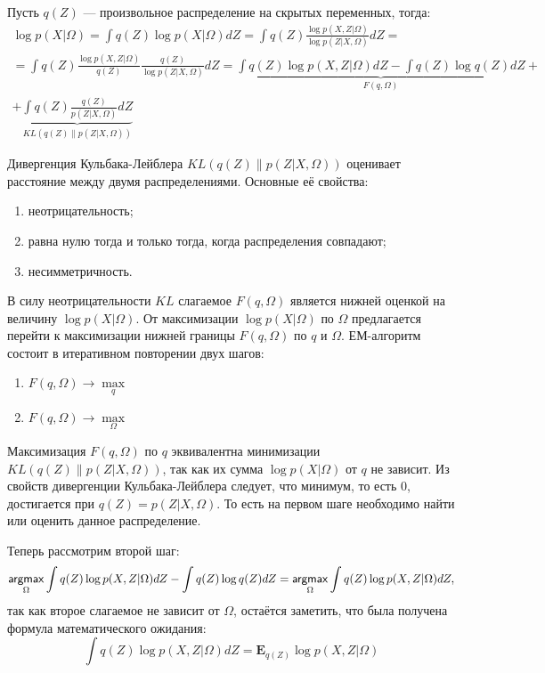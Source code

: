 \documentclass[12pt]{article}
\newcommand{\argmax}{\mathop{\mathsf{argmax}}\limits}
\begin{document}
 Пусть $q(Z)$ --- произвольное распределение на скрытых переменных, тогда:
\begin{multline}
\label{eq:emdecomposition}
\log p(X|\Omega) = \int q(Z) \log p(X|\Omega) dZ = \int q(Z) \frac{\log p(X, Z|\Omega)}{\log p(Z|X,\Omega)} dZ = 
\\
=  \int q(Z) \frac{\log p(X, Z|\Omega)}{q(Z)} \frac{q(Z)}{\log p(Z|X,\Omega)} dZ =  \underbrace{  \int q(Z) \log p(X, Z|\Omega) dZ  - \int q(Z) \log q(Z) dZ }_{F(q, \Omega)} +
\\
+  \underbrace{  \int q(Z) \frac{q(Z)}{p(Z|X,\Omega)} dZ }_{KL(q(Z)\|p(Z|X,\Omega))}
\end{multline}

Дивергенция Кульбака-Лейблера $KL(q(Z)\|p(Z|X,\Omega))$ оценивает расстояние между двумя распределениями. Основные её свойства:
\begin{enumerate}
\item неотрицательность;
\item равна нулю тогда и только тогда, когда распределения совпадают;
\item несимметричность.
\end{enumerate}

В силу неотрицательности $KL$ слагаемое $F(q, \Omega)$ является нижней оценкой на величину $\log p(X|\Omega)$. От максимизации $\log p(X|\Omega)$ по $\Omega$ предлагается перейти к максимизации нижней границы $F(q, \Omega)$ по $q$ и $\Omega$. ЕМ-алгоритм состоит в итеративном повторении двух шагов:
\begin{enumerate}
\item $F(q, \Omega) \to \max\limits_q$
\item $F(q, \Omega) \to \max\limits_{\Omega}$
\end{enumerate}

Максимизация $F(q, \Omega)$ по $q$ эквивалентна минимизации $KL(q(Z)\|p(Z|X,\Omega))$, так как их сумма $\log p(X|\Omega)$ от $q$ не зависит. Из свойств дивергенции Кульбака-Лейблера следует, что минимум, то есть $0$, достигается при $q(Z) = p(Z|X,\Omega)$. То есть на первом шаге необходимо найти или оценить данное распределение. 

Теперь рассмотрим второй шаг:
\[
\argmax\limits_{\Omega} \int q(Z) \log p(X, Z|\Omega) dZ  - \int q(Z) \log q(Z) dZ  =\argmax\limits_{\Omega}  \int q(Z) \log p(X, Z|\Omega) dZ ,
\]
так как второе слагаемое не зависит от $\Omega$, остаётся заметить, что была получена формула математического ожидания:
\[
 \int q(Z) \log p(X, Z|\Omega) dZ = \mathbf{E}_{q(Z)} \log p(X, Z|\Omega)
\]
\end{document}
